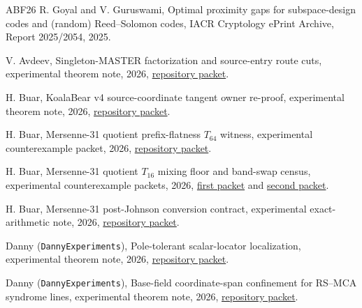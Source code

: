 \documentclass[11pt,a4paper]{amsart}
\numberwithin{equation}{section}
\theoremstyle{remark}
\begin{document}
\begin{thebibliography}{ABF26}
R. Goyal and V. Guruswami,
\newblock Optimal proximity gaps for subspace-design codes and (random) Reed--Solomon codes,
\newblock IACR Cryptology ePrint Archive, Report 2025/2054, 2025.

V. Avdeev,
\newblock Singleton-MASTER factorization and source-entry route cuts,
\newblock experimental theorem note, 2026,
\newblock \href{https://github.com/przchojecki/rs-mca/blob/5ecb9ab538a0a57dcb81018b17f32849049fb998/experimental/notes/thresholds/singleton_master_reductions.md}{repository packet}.

H. Buar,
\newblock KoalaBear v4 source-coordinate tangent owner re-proof,
\newblock experimental theorem note, 2026,
\newblock \href{https://github.com/przchojecki/rs-mca/blob/5ecb9ab538a0a57dcb81018b17f32849049fb998/experimental/notes/frontier-adjacent/kb_mca_v4_tangent_source_adapter_v1.md}{repository packet}.

H. Buar,
\newblock Mersenne-31 quotient prefix-flatness $T_{64}$ witness,
\newblock experimental counterexample packet, 2026,
\newblock \href{https://github.com/przchojecki/rs-mca/pull/1048}{repository packet}.

H. Buar,
\newblock Mersenne-31 quotient $T_{16}$ mixing floor and band-swap census,
\newblock experimental counterexample packets, 2026,
\newblock \href{https://github.com/przchojecki/rs-mca/pull/1055}{first packet} and \href{https://github.com/przchojecki/rs-mca/pull/1056}{second packet}.

H. Buar,
\newblock Mersenne-31 post-Johnson conversion contract,
\newblock experimental exact-arithmetic note, 2026,
\newblock \href{https://github.com/przchojecki/rs-mca/pull/1057}{repository packet}.

Danny (\texttt{DannyExperiments}),
\newblock Pole-tolerant scalar-locator localization,
\newblock experimental theorem note, 2026,
\newblock \href{https://github.com/przchojecki/rs-mca/blob/5ecb9ab538a0a57dcb81018b17f32849049fb998/experimental/notes/m2/pole_tolerant_scalar_locator_localization.md}{repository packet}.

Danny (\texttt{DannyExperiments}),
\newblock Base-field coordinate-span confinement for RS--MCA syndrome lines,
\newblock experimental theorem note, 2026,
\newblock \href{https://github.com/przchojecki/rs-mca/blob/5ecb9ab538a0a57dcb81018b17f32849049fb998/experimental/notes/thresholds/base_field_coordinate_span_confinement.md}{repository packet}.


\end{thebibliography}
\end{document}
